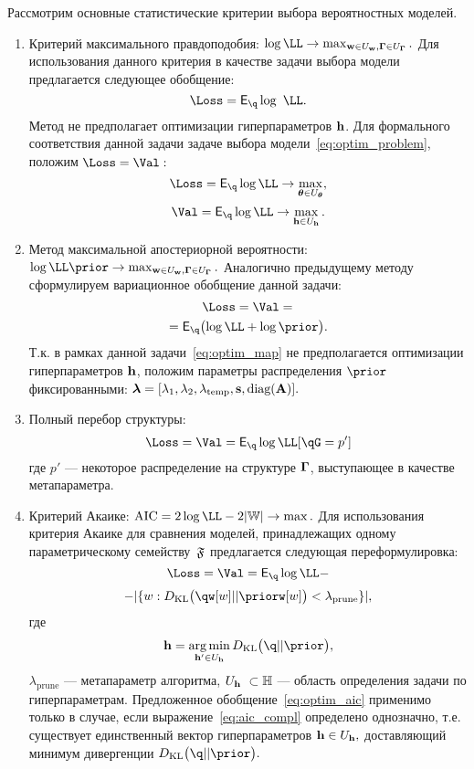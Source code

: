 \documentclass[11pt, a5paper]{dissert}
\theoremstyle{definition}
\DeclareMathOperator*{\argmin}{arg\,min}
\begin{document}
{Рассмотрим основные статистические критерии выбора вероятностных моделей. 
\begin{enumerate}
\item Критерий максимального правдоподобия:
$\log \LL \to \max_{\w \in \Uw, \G \in \UG}.$
Для использования данного критерия в качестве задачи выбора модели предлагается следующее обобщение:
\begin{equation}
\label{eq:optim_ml}
    \Loss =  \E_{\q} \log~\LL.
\end{equation}
Метод не предполагает оптимизации гиперпараметров $\mathbf{h}$. Для формального соответствия данной задачи задаче выбора модели~\eqref{eq:optim_problem}, положим $\Loss=\Val:$
\[
    \Loss =  \E_{\q}\log \LL \to \max_{\teta \in \Uteta},
\]
\[
    \Val =  \E_{\q}\log \LL \to \max_{\h \in \Uh}.
\]



\item Метод максимальной апостериорной вероятности:
$\log \LL \prior \to \max_{\w  \in \Uw, \G \in \UG}.$
Аналогично предыдущему методу сформулируем вариационное обобщение данной задачи:
\begin{equation}
\label{eq:optim_map}
\Loss = \Val = 
\end{equation}
\[
 = \E_{\q} \bigl( \log\LL + \log\prior \bigr).
\]
Т.к. в рамках данной задачи~\eqref{eq:optim_map} не предполагается оптимизации гиперпараметров $\mathbf{h}$, положим параметры распределения $\prior$ фиксированными:
$
   \boldsymbol{\lambda} = [\lambda_1, \lambda_2, \lambda_{\text{temp}}, \mathbf{s}, \text{diag}(\mathbf{A})].
$

\item Полный перебор структуры:
\begin{equation}
\label{eq:optim_struct}
    \Loss = \Val = \E_{\q} \log \LL [\qG = p']
\end{equation}
где $p'$ --- некоторое распределение на структуре $\boldsymbol{\Gamma}$, выступающее в качестве метапараметра.




\item Критерий Акаике:
$
   \text{AIC} =  2\log \LL - 2|\Wb| \to \max.
$
Для использования критерия Акаике для сравнения моделей, принадлежащих одному параметрическому семейству~$\mathfrak{F}$ предлагается следующая переформулировка:
\begin{equation}
\label{eq:optim_aic}
    \Loss = \Val = \E_{\q}\log \LL - 
\end{equation}
\[
 - |\{w: \KL{\qw[w]}{\priorw[w]}<\lambda_\text{prune}\}|,
\]
где 
\begin{equation}\label{eq:aic_compl}\h=\argmin_{\h' \in \Uh} \KL{\q}{\prior},\end{equation} $\lambda_{\text{prune}}$ --- метапараметр алгоритма, $\Uh  \subset \Hb$ --- область определения задачи по гиперпараметрам. Предложенное обобщение~\eqref{eq:optim_aic} применимо только в случае, если выражение~\eqref{eq:aic_compl} определено однозначно, т.е. существует единственный вектор гиперпараметров  $\mathbf{h} \in U_{\mathbf{h}},$ доставляющий минимум дивергенции $\KL{\q}{\prior}.$


\end{enumerate}}
\end{document}
